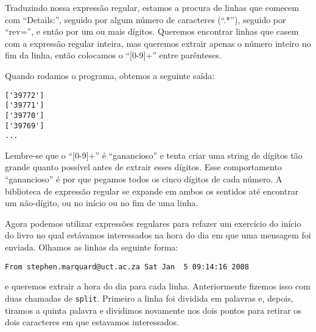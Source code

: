 Traduzindo nossa expressão regular, estamos a procura de linhas que comecem com ``Details:'',
seguido por algum número de caracteres (``.*''), seguido por ``rev='', e então por um ou mais 
dígitos. Queremos encontrar linhas que casem com a expressão regular inteira, mas queremos 
extrair apenas o número inteiro no fim da linha, então colocamos o ``[0-9]+'' entre parênteses.

Quando rodamos o programa, obtemos a seguinte saída:

\beforeverb
\begin{verbatim}
['39772']
['39771']
['39770']
['39769']
...
\end{verbatim}
\afterverb
%

Lembre-se que o ``[0-9]+'' é ``ganancioso'' e tenta criar uma string de dígitos tão grande quanto 
possível antes de extrair esses dígitos. Esse comportamento ``ganancioso'' é por que pegamos todos 
os cinco dígitos de cada número. A biblioteca de expressão regular se expande em ambos os sentidos 
até encontrar um não-dígito, ou no início ou no fim de uma linha.

Agora podemos utilizar expressões regulares para refazer um exercício do início do livro no qual 
estávamos interessados na hora do dia em que uma mensagem foi enviada. Olhamos as linhas da 
seguinte forma: 

\beforeverb
\begin{verbatim}
From stephen.marquard@uct.ac.za Sat Jan  5 09:14:16 2008
\end{verbatim}
\afterverb
%

e queremos extrair a hora do dia para cada linha. Anteriormente fizemos isso com duas chamadas de
{\tt split}. Primeiro a linha foi dividida em palavras e, depois, tiramos a quinta palavra e dividimos 
novamente nos dois pontos para retirar os dois caracteres em que estavamos interessados.


